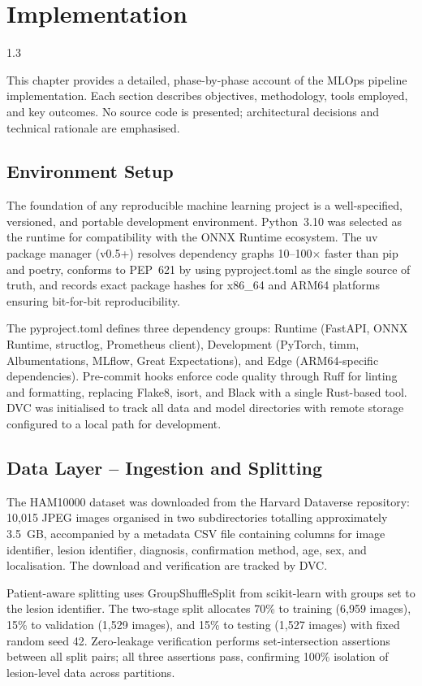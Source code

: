 
\chapter{Implementation}
\begin{spacing}{1.3}

This chapter provides a detailed, phase-by-phase account of the MLOps pipeline implementation. Each section describes objectives, methodology, tools employed, and key outcomes. No source code is presented; architectural decisions and technical rationale are emphasised.

\section{Environment Setup}

The foundation of any reproducible machine learning project is a well-specified, versioned, and portable development environment. Python~3.10 was selected as the runtime for compatibility with the ONNX Runtime ecosystem. The uv package manager (v0.5+) resolves dependency graphs 10--100$\times$ faster than pip and poetry, conforms to PEP~621 by using pyproject.toml as the single source of truth, and records exact package hashes for x86\_64 and ARM64 platforms ensuring bit-for-bit reproducibility.

The pyproject.toml defines three dependency groups: Runtime (FastAPI, ONNX Runtime, structlog, Prometheus client), Development (PyTorch, timm, Albumentations, MLflow, Great Expectations), and Edge (ARM64-specific dependencies). Pre-commit hooks enforce code quality through Ruff for linting and formatting, replacing Flake8, isort, and Black with a single Rust-based tool. DVC was initialised to track all data and model directories with remote storage configured to a local path for development.

\section{Data Layer -- Ingestion and Splitting}

The HAM10000 dataset was downloaded from the Harvard Dataverse repository: 10,015 JPEG images organised in two subdirectories totalling approximately 3.5~GB, accompanied by a metadata CSV file containing columns for image identifier, lesion identifier, diagnosis, confirmation method, age, sex, and localisation. The download and verification are tracked by DVC.

Patient-aware splitting uses GroupShuffleSplit from scikit-learn with groups set to the lesion identifier. The two-stage split allocates 70\% to training (6,959 images), 15\% to validation (1,529 images), and 15\% to testing (1,527 images) with fixed random seed 42. Zero-leakage verification performs set-intersection assertions between all split pairs; all three assertions pass, confirming 100\% isolation of lesion-level data across partitions.


\end{spacing}
